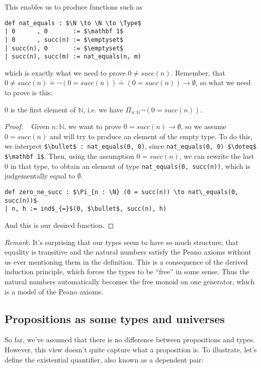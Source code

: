 \documentclass[a4paper, 12pt]{article}
\newcommand{\N}{\mathbb{N}}
\newcommand{\Type}{\mathit{Type}}
\theoremstyle{changedot}
\theoremstyle{changedotbreak}
\theoremstyle{nonumberplain}
\newtheorem{proof}{Proof}
\begin{document}
This enables us to produce functions such as

\begin{lstlisting}[mathescape=true]
def nat_equals : $\N \to \N \to \Type$
| 0      , 0       := $\mathbf 1$
| 0      , succ(n) := $\emptyset$
| succ(n), 0       := $\emptyset$
| succ(n), succ(m) := nat_equals(n, m)
\end{lstlisting}

which is exactly what we need to prove $0 \neq succ(n)$. Remember, that $0 \neq succ(n) \doteq \neg(0 = succ(n)) \doteq (0 = succ(n)) \to \emptyset$, so what we need to prove is this:

\begin{theorem}\label{thm:zero_ne_succ}
  $0$ is the first element of $\N$, i.e. we have $\Pi_{n:\N} \neg(0 = succ(n))$.
\end{theorem}
\begin{proof}~
  Given $n : \N$, we want to prove $0 = succ(n) \to \emptyset$, so we assume $0 = succ(n)$ and will try to produce an element of the empty type. To do this, we interpret \lstinline{$\bullet$ : nat_equals(0, 0)}, since \lstinline{nat_equals(0, 0) $\doteq$ $\mathbf 1$}. Then, using the assumption $0 = succ(n)$, we can rewrite the last $0$ in that type, to obtain an element of type \lstinline{nat_equals(0, succ(n))}, which is judgementally equal to $\emptyset$.

\begin{lstlisting}[mathescape=true]
def zero_ne_succ : $\Pi_{n : \N} (0 = succ(n)) \to nat\_equals(0, succ(n))$
| n, h := ind$_{=}$(0, $\bullet$, succ(n), h)
\end{lstlisting}
  And this is our desired function.
\end{proof}

\textit{Remark.} It's surprising that our types seem to have so much structure, that equality is transitive and the natural numbers satisfy the Peano axioms without us ever mentioning them in the definition. This is a consequence of the derived induction principle, which forces the types to be ``free'' in some sense. Thus the natural numbers automatically becomes the free monoid on one generator, which is a model of the Peano axioms.

\subsection{Propositions as some types and universes}
So far, we've assumed that there is no difference between propositions and types. However, this view doesn't quite capture what a proposition is. To illustrate, let's define the existential quantifier, also known as a dependent pair:
\end{document}
